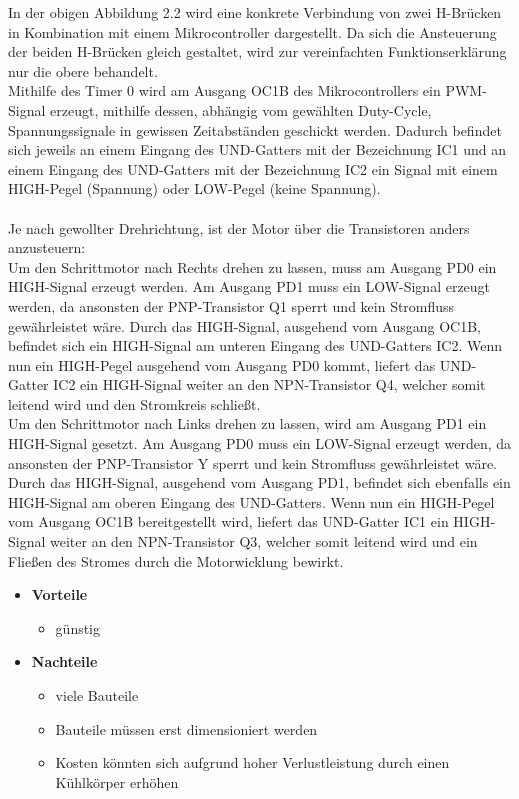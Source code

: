 In der obigen Abbildung 2.2 wird eine konkrete Verbindung von zwei H-Brücken in Kombination mit einem Mikrocontroller dargestellt.
Da sich die Ansteuerung der beiden H-Brücken gleich gestaltet, wird zur vereinfachten Funktionserklärung nur die obere behandelt. \\
Mithilfe des Timer 0 wird am Ausgang OC1B des Mikrocontrollers ein PWM-Signal erzeugt, mithilfe dessen, abhängig vom gewählten Duty-Cycle, Spannungssignale in gewissen Zeitabständen geschickt werden.
Dadurch befindet sich jeweils an einem Eingang des UND-Gatters mit der Bezeichnung IC1 und an einem Eingang des UND-Gatters mit der Bezeichnung IC2 ein Signal mit einem HIGH-Pegel (Spannung) oder
LOW-Pegel (keine Spannung). \\\\
Je nach gewollter Drehrichtung, ist der Motor über die Transistoren anders anzusteuern: \\
Um den Schrittmotor nach Rechts drehen zu lassen, muss am Ausgang PD0 ein HIGH-Signal erzeugt werden.
Am Ausgang PD1 muss ein LOW-Signal erzeugt werden, da ansonsten der PNP-Transistor Q1 sperrt und kein Stromfluss gewährleistet wäre.
Durch das HIGH-Signal, ausgehend vom Ausgang OC1B, befindet sich ein HIGH-Signal am unteren Eingang des UND-Gatters IC2.
Wenn nun ein HIGH-Pegel ausgehend vom Ausgang PD0 kommt, liefert das UND-Gatter IC2 ein HIGH-Signal weiter an den NPN-Transistor Q4, welcher somit leitend wird und den Stromkreis schließt. \\
Um den Schrittmotor nach Links drehen zu lassen, wird am Ausgang PD1 ein HIGH-Signal gesetzt.
Am Ausgang PD0 muss ein LOW-Signal erzeugt werden, da ansonsten der PNP-Transistor Y sperrt und kein Stromfluss gewährleistet wäre.
Durch das HIGH-Signal, ausgehend vom Ausgang PD1, befindet sich ebenfalls ein HIGH-Signal am oberen Eingang des UND-Gatters.
Wenn nun ein HIGH-Pegel vom Ausgang OC1B bereitgestellt wird, liefert das UND-Gatter IC1 ein HIGH-Signal weiter an den NPN-Transistor Q3, welcher somit leitend wird und
ein Fließen des Stromes durch die Motorwicklung bewirkt.

\begin{itemize}
\item \textbf{Vorteile}
\begin{itemize}
\item günstig
\end{itemize}
\item \textbf{Nachteile}
\begin{itemize}
\item viele Bauteile
\item Bauteile müssen erst dimensioniert werden
\item Kosten könnten sich aufgrund hoher Verlustleistung durch einen Kühlkörper erhöhen
\end{itemize}
\end{itemize}

